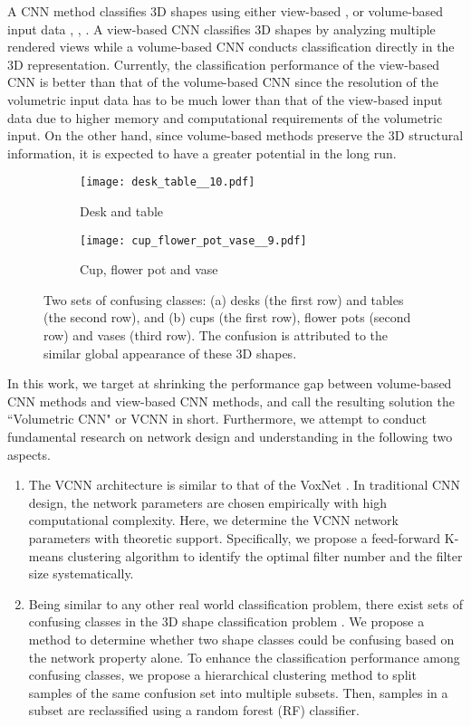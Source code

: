 \documentclass[preprint,12pt]{elsarticle}
\begin{document}
A CNN method classifies 3D shapes using either view-based
\cite{shi2015deeppano}, \cite{su2015multi} or volume-based input data
\cite{maturana2015voxnet}, \cite{qi2016volumetric}, \cite{wu20153d}.  A
view-based CNN classifies 3D shapes by analyzing multiple rendered views
while a volume-based CNN conducts classification directly in the 3D
representation. Currently, the classification performance of the
view-based CNN is better than that of the volume-based CNN since the
resolution of the volumetric input data has to be much lower than that
of the view-based input data due to higher memory and computational
requirements of the volumetric input.  On the other hand, since
volume-based methods preserve the 3D structural information, it is
expected to have a greater potential in the long run. 

\begin{figure}[!t]
\centering
\begin{subfigure}[b] {0.75\textwidth}
\centering
\texttt{[image: desk\_table\_\_10.pdf]}
\caption{Desk and table}
\end{subfigure}
\centering
\begin{subfigure}[b]{0.75\textwidth}
\texttt{[image: cup\_flower\_pot\_vase\_\_9.pdf]}
\caption{Cup, flower pot and vase}
\end{subfigure}
\caption{Two sets of confusing classes: (a) desks (the first row)
and tables (the second row), and (b) cups (the first row), flower pots
(second row) and vases (third row). The confusion is attributed to the
similar global appearance of these 3D shapes.} \label{fig.confusion_cluster}
\end{figure}

In this work, we target at shrinking the performance gap between
volume-based CNN methods and view-based CNN methods, and call the
resulting solution the ``Volumetric CNN" or VCNN in short.  Furthermore,
we attempt to conduct fundamental research on network design and
understanding in the following two aspects. 
\begin{enumerate}
\item The VCNN architecture is similar to that of the VoxNet
\cite{maturana2015voxnet}. In traditional CNN design, the network
parameters are chosen empirically with high computational complexity.
Here, we determine the VCNN network parameters with theoretic support.
Specifically, we propose a feed-forward K-means clustering algorithm to
identify the optimal filter number and the filter size systematically. 
\item Being similar to any other real world classification problem,
there exist sets of confusing classes in the 3D shape classification
problem \cite{dong2015looking}. We propose a method to determine whether
two shape classes could be confusing based on the network property
alone.  To enhance the classification performance among confusing
classes, we propose a hierarchical clustering method to split samples of
the same confusion set into multiple subsets. Then, samples in a subset
are reclassified using a random forest (RF) classifier. 
\end{enumerate}
\end{document}
